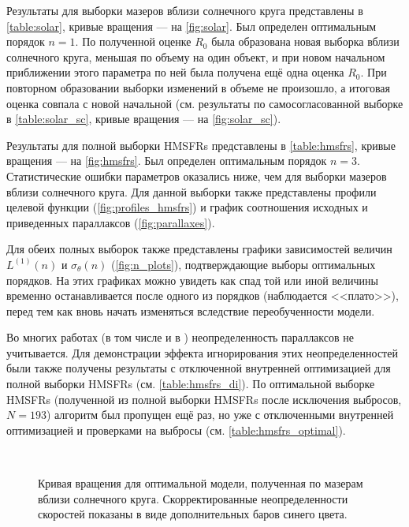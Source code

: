 \documentclass[a4paper, oneside, 14pt]{article}
\begin{document}
Результаты для выборки мазеров вблизи солнечного круга представлены в \autoref{table:solar}, кривые вращения --- на \autoref{fig:solar}. Был определен оптимальным порядок $ n = 1 $. По полученной оценке $ R_0 $ была образована новая выборка вблизи солнечного круга, меньшая по объему на один объект, и при новом начальном приближении этого параметра по ней была получена ещё одна оценка $ R_0 $. При повторном образовании выборки изменений в объеме не произошло, а итоговая оценка совпала с новой начальной (см. результаты по самосогласованной выборке в \autoref{table:solar_sc}, кривые вращения --- на \autoref{fig:solar_sc}).

Результаты для полной выборки HMSFRs представлены в \autoref{table:hmsfrs}, кривые вращения --- на \autoref{fig:hmsfrs}. Был определен оптимальным порядок $ n = 3 $. Статистические ошибки параметров оказались ниже, чем для выборки мазеров вблизи солнечного круга. Для данной выборки также представлены профили целевой функции (\autoref{fig:profiles_hmsfrs}) и график соотношения исходных и приведенных параллаксов (\autoref{fig:parallaxes}).

Для обеих полных выборок также представлены графики зависимостей величин $ L^{(1)}(n) $ и $ \sigma_\theta(n) $ (\autoref{fig:n_plots}), подтверждающие выборы оптимальных порядков. На этих графиках можно увидеть как спад той или иной величины временно останавливается после одного из порядков (наблюдается <<плато>>), перед тем как вновь начать изменяться вследствие переобученности модели.

Во многих работах (в том числе и в \cite{R.2019}) неопределенность параллаксов не учитывается. Для демонстрации эффекта игнорирования этих неопределенностей были также получены результаты с отключенной внутренней оптимизацией для полной выборки HMSFRs (см. \autoref{table:hmsfrs_di}). По оптимальной выборке HMSFRs (полученной из полной выборки HMSFRs после исключения выбросов, $ N = 193 $) алгоритм был пропущен ещё раз, но уже с отключенными внутренней оптимизацией и проверками на выбросы (см. \autoref{table:hmsfrs_optimal}).

\clearpage



\begin{figure}[p!]
  \centering
  \subfloat{{\texttt{[image: Near the solar circle/n = 1/Fitted rotation curve]}}}\\
  \subfloat{{\texttt{[image: Near the solar circle/n = 1/Fitted rotation curve (errors)]}}}
  \caption{Кривая вращения для оптимальной модели, полученная по мазерам вблизи солнечного круга. Скорректированные неопределенности скоростей показаны в виде дополнительных баров синего цвета.}
  \label{fig:solar}
\end{figure}
\end{document}
